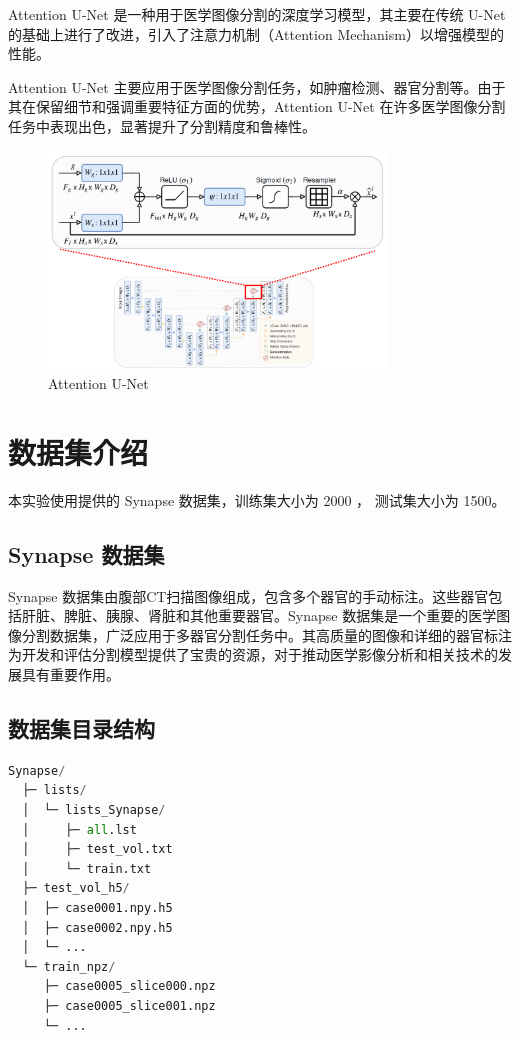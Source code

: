 \documentclass[a4paper,12pt]{report}
\begin{document}
Attention U-Net 是一种用于医学图像分割的深度学习模型，其主要在传统 U-Net 的基础上进行了改进，引入了注意力机制（Attention Mechanism）以增强模型的性能。

Attention U-Net 主要应用于医学图像分割任务，如肿瘤检测、器官分割等。由于其在保留细节和强调重要特征方面的优势，Attention U-Net 在许多医学图像分割任务中表现出色，显著提升了分割精度和鲁棒性。

\begin{figure}[H]
    \centering
    \includegraphics[width=0.8\textwidth]{figure/AttU-Net.png}
    \caption{Attention U-Net}
    \label{fig:login}
\end{figure}





\section{数据集介绍}
本实验使用提供的 Synapse 数据集，训练集大小为 2000 ， 测试集大小为 1500。

\subsection{Synapse 数据集}
Synapse 数据集由腹部CT扫描图像组成，包含多个器官的手动标注。这些器官包括肝脏、脾脏、胰腺、肾脏和其他重要器官。Synapse 数据集是一个重要的医学图像分割数据集，广泛应用于多器官分割任务中。其高质量的图像和详细的器官标注为开发和评估分割模型提供了宝贵的资源，对于推动医学影像分析和相关技术的发展具有重要作用。

\subsection{数据集目录结构}
\begin{lstlisting}[language=Python]
Synapse/
  ├─ lists/
  │  └─ lists_Synapse/
  │     ├─ all.lst
  │     ├─ test_vol.txt
  │     └─ train.txt
  ├─ test_vol_h5/
  │  ├─ case0001.npy.h5
  │  ├─ case0002.npy.h5
  │  └─ ...
  └─ train_npz/
     ├─ case0005_slice000.npz
     ├─ case0005_slice001.npz
     └─ ...
\end{lstlisting}
\end{document}
